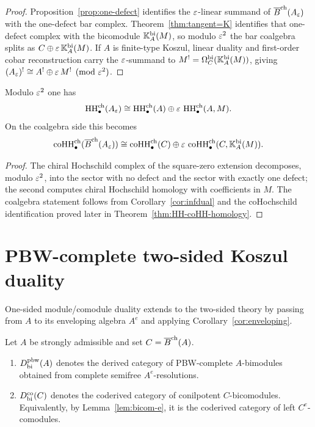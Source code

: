 \begin{proof}
Proposition~\ref{prop:one-defect} identifies the
$\varepsilon$-linear summand of $\overline{B}^{\mathrm{ch}}(A_\varepsilon)$ with the one-defect bar
complex.
Theorem~\ref{thm:tangent=K} identifies that one-defect complex with
the bicomodule $\mathbb{K}_A^{\mathrm{bi}}(M)$, so modulo $\varepsilon^2$ the bar
coalgebra splits as
$C\oplus \varepsilon\,\mathbb{K}_A^{\mathrm{bi}}(M)$.
If $A$ is finite-type Koszul, linear duality and first-order cobar
reconstruction carry the $\varepsilon$-summand to
$M^!=\Omega_C^{\mathrm{bi}}(\mathbb{K}_A^{\mathrm{bi}}(M))$, giving
$(A_\varepsilon)^!\cong A^!\oplus \varepsilon\,M^! \pmod{\varepsilon^2}$.
\end{proof}

\begin{proposition}
\ClaimStatusProvedHere
\label{prop:infann}
Modulo $\varepsilon^2$ one has
\[
\operatorname{HH}^{\mathrm{ch}}_\bullet(A_\varepsilon)
\cong
\operatorname{HH}^{\mathrm{ch}}_\bullet(A)\oplus \varepsilon\, \operatorname{HH}^{\mathrm{ch}}_\bullet(A,M).
\]
On the coalgebra side this becomes
\[
\operatorname{coHH}^{\mathrm{ch}}_\bullet(\overline{B}^{\mathrm{ch}}(A_\varepsilon))
\cong
\operatorname{coHH}^{\mathrm{ch}}_\bullet(C)\oplus \varepsilon\,
\operatorname{coHH}^{\mathrm{ch}}_\bullet(C,\mathbb{K}_A^{\mathrm{bi}}(M)).
\]
\end{proposition}

\begin{proof}
The chiral Hochschild complex of the square-zero extension decomposes, modulo $\varepsilon^2$, into the sector with
no defect and the sector with exactly one defect; the second computes chiral Hochschild homology with
coefficients in $M$. The coalgebra statement follows from
Corollary~\ref{cor:infdual} and the coHochschild identification proved later in
Theorem~\ref{thm:HH-coHH-homology}.
\end{proof}

\section{PBW-complete two-sided Koszul duality}
\label{sec:bimod-bicomod}

One-sided module/comodule duality extends to the
two-sided theory by passing from $A$ to its enveloping algebra $A^e$ and applying
Corollary~\ref{cor:enveloping}.

\begin{definition}
Let $A$ be strongly admissible and set $C=\overline{B}^{\mathrm{ch}}(A)$.
\begin{enumerate}[label=(\alph*)]
\item $D^{\mathrm{pbw}}_{\mathrm{bi}}(A)$ denotes the derived category of PBW-complete $A$-bimodules obtained
from complete semifree $A^e$-resolutions.

\item $D^{\mathrm{co}}_{\mathrm{bi}}(C)$ denotes the coderived category of conilpotent $C$-bicomodules.
Equivalently, by Lemma~\ref{lem:bicom-e}, it is the coderived category of left $C^e$-comodules.
\end{enumerate}
\end{definition}

